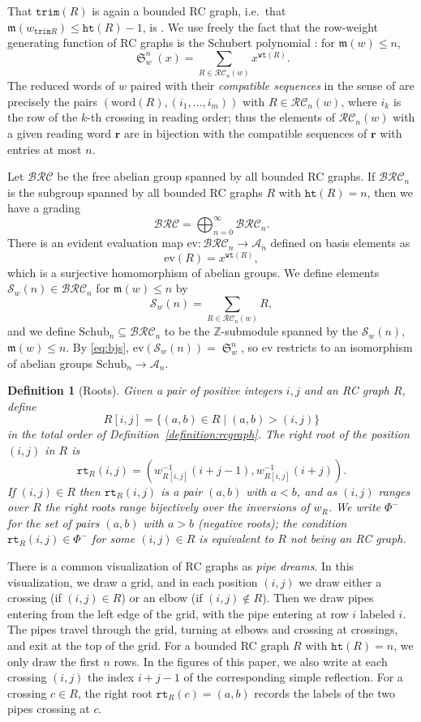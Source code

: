 \documentclass[pdflatex,sn-mathphys-num]{sn-jnl}
\numberwithin{equation}{subsection}
\DeclareMathOperator{\sch}{\mathfrak{S}}
\newcommand{\wof}[1]{w_{#1}}
\newcommand{\wtt}{\mathtt{wt}}
\newcommand{\rtt}{\mathtt{rt}}
\newcommand{\trm}{\mathtt{trim}}
\newcommand{\hr}{\mathtt{ht}}
\newcommand{\BRC}{\mathcal{BRC}}
\newcommand{\RC}{\mathcal{RC}}
\newcommand{\coma}{\mathcal{A}}
\newcommand{\maxd}{\mathfrak{m}}
\theoremstyle{thmstyleone}
\theoremstyle{thmstylethree}
\newtheorem{definition}[lemma]{Definition}
\theoremstyle{thmstyletwo}
\begin{document}
That $\trm(R)$ is again a bounded RC graph, i.e.\ that $\maxd(\wof{\trm R})\leq\hr(R)-1$, is \cite[Lemma~\ref*{B-L:trim}]{samuelbialgebra}. We use freely the fact that the row-weight generating function of RC graphs is the Schubert polynomial \cite{bjs,fominstan}: for $\maxd(w)\leq n$,
\begin{equation}\label{eq:bjs}
\sch_w^n(x) = \sum_{R\in\RC_n(w)} x^{\wtt(R)}.
\end{equation}
The reduced words of $w$ paired with their \emph{compatible sequences} in the sense of \cite{bjs} are precisely the pairs $(\mathrm{word}(R),(i_1,\ldots,i_m))$ with $R\in\RC_n(w)$, where $i_k$ is the row of the $k$-th crossing in reading order; thus the elements of $\RC_n(w)$ with a given reading word $\mathbf r$ are in bijection with the compatible sequences of $\mathbf r$ with entries at most $n$.

Let $\BRC$ be the free abelian group spanned by all bounded RC graphs. If $\BRC_n$ is the subgroup spanned by all bounded RC graphs $R$ with $\hr(R)=n$, then we have a grading
$$\BRC = \bigoplus_{n=0}^\infty \BRC_n.$$
There is an evident evaluation map $\mathrm{ev}: \BRC_n\to \coma_n$ defined on basis elements as
$$\mathrm{ev}(R) = x^{\wtt(R)},$$
which is a surjective homomorphism of abelian groups. We define elements $\mathcal{S}_w(n)\in\BRC_n$ for $\maxd(w)\leq n$ by
$$\mathcal{S}_w(n) = \sum_{R\in\RC_n(w)}R,$$
and we define $\mathrm{Schub}_n\subseteq\BRC_n$ to be the $\mathbb{Z}$-submodule spanned by the $\mathcal{S}_w(n)$, $\maxd(w)\leq n$. By \eqref{eq:bjs}, $\mathrm{ev}(\mathcal{S}_w(n))=\sch_w^n$, so $\mathrm{ev}$ restricts to an isomorphism of abelian groups $\mathrm{Schub}_n\to\coma_n$.

\begin{definition}[Roots]\label{definition:roots}
Given a pair of positive integers $i,j$ and an RC graph $R$, define 
$$R[i, j]=\{(a, b)\in R\mid (a, b) > (i, j)\}$$
in the total order of Definition~\ref{definition:rcgraph}. The \emph{right root} of the position $(i,j)$ in $R$ is
$$\rtt_R(i,j)=(\wof{R[i, j]}^{-1}(i + j - 1), \wof{R[i,j]}^{-1}(i+j)).$$
If $(i,j)\in R$ then $\rtt_R(i,j)$ is a pair $(a,b)$ with $a<b$, and as $(i,j)$ ranges over $R$ the right roots range bijectively over the inversions of $\wof{R}$. We write $\Phi^-$ for the set of pairs $(a,b)$ with $a>b$ (negative roots); the condition $\rtt_R(i,j)\in\Phi^-$ for some $(i,j)\in R$ is equivalent to $R$ not being an RC graph.
\end{definition}

There is a common visualization of RC graphs as \emph{pipe dreams}. In this visualization, we draw a grid, and in each position $(i,j)$ we draw either a crossing (if $(i,j)\in R$) or an elbow (if $(i,j)\notin R$). Then we draw pipes entering from the left edge of the grid, with the pipe entering at row $i$ labeled $i$. The pipes travel through the grid, turning at elbows and crossing at crossings, and exit at the top of the grid. For a bounded RC graph $R$ with $\hr(R)=n$, we only draw the first $n$ rows. In the figures of this paper, we also write at each crossing $(i,j)$ the index $i+j-1$ of the corresponding simple reflection. For a crossing $c\in R$, the right root $\rtt_R(c)=(a,b)$ records the labels of the two pipes crossing at $c$.
\end{document}
